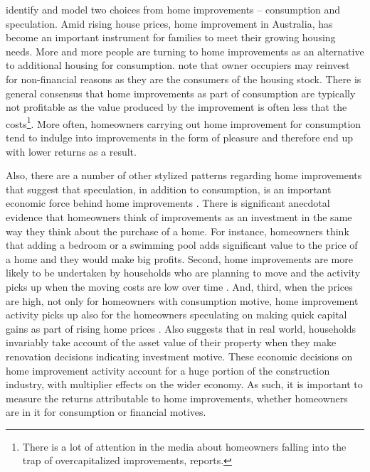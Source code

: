 \documentclass[AEJ,reqno, draftmode]{AEA} %
\begin{document}
\citet{choi2014speculating} identify and model two choices from home improvements -- consumption and speculation. Amid rising house prices, home improvement in Australia, has become an important instrument for families to meet their growing housing needs. More and more people are turning to home improvements as an alternative to additional housing for consumption. \citet{gyourko2004reinvestment} note that owner occupiers may reinvest for non-financial reasons as they are the consumers of the housing stock. There is general consensus that home improvements as part of consumption are typically not profitable as the value produced by the improvement is often less that the costs\footnote{There is a lot of attention in the media about homeowners falling into the trap of overcapitalized improvements, \citet{newsarticleovercapital} reports.}. More often, homeowners carrying out home improvement for consumption tend to indulge into improvements in the form of pleasure and therefore end up with lower returns as a result. 

Also, there are a number of other stylized patterns regarding home improvements that suggest that speculation, in addition to consumption, is an important economic force behind home improvements \citep{choi2014speculating}. There is significant anecdotal evidence that homeowners think of improvements as an investment in the same way they think about the purchase of a home. For instance, homeowners think that adding a bedroom or a swimming pool adds significant value to the price of a home and they would make big profits. Second, home improvements are more likely to be undertaken by households who are planning to move and the activity picks up when the moving costs are low over time \citep{jointcentreharvard}. And, third, when the prices are high, not only for homeowners with consumption motive, home improvement activity picks up also for the homeowners speculating on making quick capital gains as part of rising home prices \citep{choi2014speculating}. Also \citet{helms2003understanding} suggests that in real world, households invariably take account of the asset value of their property when they make renovation decisions indicating investment motive. These economic decisions on home improvement activity account for a huge portion of the construction industry, with multiplier effects on the wider economy. As such, it is important to measure the returns attributable to home improvements, whether homeowners are in it for consumption or financial motives. 
\end{document}
